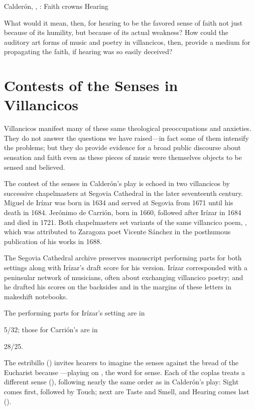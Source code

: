 \begin{expoem}
  \caption{Calderón, , : Faith crowns Hearing}
  \label{expoem:Calderon-Retiro-Hearing}
\end{expoem}

What would it mean, then, for hearing to be the favored sense of faith not just because of its humility, but because of its actual weakness?
How could the auditory art forms of music and poetry in villancicos, then, provide a medium for propagating the faith, if hearing was so easily deceived?

\section{Contests of the Senses in Villancicos}

Villancicos manifest many of these same theological preoccupations and anxieties.
They do not answer the questions we have raised---in fact some of them intensify the problems; but they do provide evidence for a broad public discourse about sensation and faith even as these pieces of music were themselves objects to be sensed and believed.

The contest of the senses in Calderón's play is echoed in two villancicos by successive chapelmasters at Segovia Cathedral in the later seventeenth century.
Miguel de Irízar was born in 1634 and served at Segovia from 1671 until his death in 1684.
Jerónimo de Carrión, born in 1660, followed after Irízar in 1684 and died in 1721.
Both chapelmasters set variants of the same villancico poem, , which was attributed to Zaragoza poet Vicente Sánchez in the posthumous publication of his works in 1688.

The Segovia Cathedral archive preserves manuscript performing parts for both settings along with Irízar's draft score for his version.
Irízar corresponded with a peninsular network of musicians, often about exchanging villancico poetry; and he drafted his scores on the backsides and in the margins of these letters in makeshift notebooks.
\begin{Footnote}
  The performing parts for Irízar's setting are in \signature{E-SE}{5/32}; those for Carrión's are in \signature{E-SE}{28/25}.
\end{Footnote}

The estribillo () invites hearers to imagine the senses  against the bread of the Eucharist because ---playing on , the word for sense.
Each of the coplas treats a different sense (), following nearly the same order as in Calderón's play: 
Sight comes first, followed by Touch; next are Taste and Smell, and Hearing comes last ().

